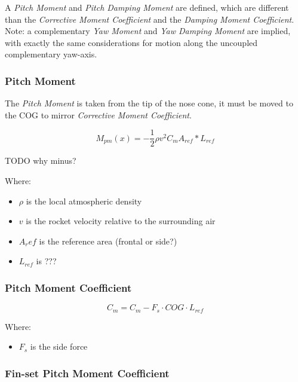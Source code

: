 \documentclass[]{article}
\providecommand{\tightlist}{%
  \setlength{\itemsep}{0pt}\setlength{\parskip}{0pt}}
\begin{document}
A \emph{Pitch Moment} and \emph{Pitch Damping Moment} are defined, which
are different than the \emph{Corrective Moment Coefficient} and the
\emph{Damping Moment Coefficient}. Note: a complementary \emph{Yaw
Moment} and \emph{Yaw Damping Moment} are implied, with exactly the same
considerations for motion along the uncoupled complementary yaw-axis.

\subsubsection{Pitch Moment}\label{pitch-moment}

The \emph{Pitch Moment} is taken from the tip of the nose cone, it must
be moved to the COG to mirror \emph{Corrective Moment Coefficient}.

\begin{equation}
\label{eq_pitching_moment}
M_{pm}(x) = - \dfrac{1}{2} \rho v^2 C_m A_{ref} * L_{ref}
\end{equation}

TODO why minus?

Where:

\begin{itemize}
\tightlist
\item
  \(\rho\) is the local atmospheric density
\item
  \(v\) is the rocket velocity relative to the surrounding air
\item
  \(A_ref\) is the reference area (frontal or side?)
\item
  \(L_{ref}\) is ???
\end{itemize}

\subsubsection{Pitch Moment Coefficient}\label{pitch-moment-coefficient}

\begin{equation}
\label{eq_pitch_moment}
C_m = C_m - F_s \cdot COG \cdot L_{ref} 
\end{equation}

Where:

\begin{itemize}
\tightlist
\item
  \(F_s\) is the side force
\end{itemize}

\subsubsection{Fin-set Pitch Moment
Coefficient}\label{fin-set-pitch-moment-coefficient}
\end{document}
